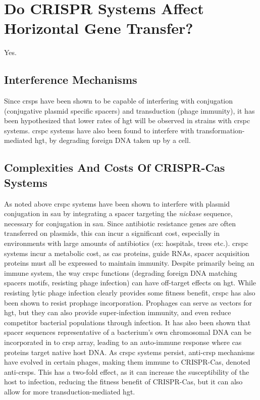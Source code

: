 \section{Do CRISPR Systems Affect Horizontal Gene Transfer?}
Yes.
\subsection{Interference Mechanisms}
Since \ac{crsp}s have been shown to be capable of interfering with conjugation (conjugative plasmid specific spacers) and transduction (phage immunity), it has been hypothesized that lower rates of \ac{hgt} will be observed in strains with \ac{crspc} systems\citep{staphlim}.
\ac{crspc} systems have also been found to interfere with transformation-mediated \ac{hgt}, by degrading foreign DNA taken up by a cell\citep{climtrans}.
\subsection{Complexities And Costs Of CRISPR-Cas Systems}
As noted above \ac{crspc} systems have been shown to interfere with plasmid conjugation in \ac{sau} by integrating a spacer targeting the \textit{nickase} sequence, necessary for conjugation in \ac{sau}\citep{staphlim}.
Since antibiotic resistance genes are often transferred on plasmids, this can incur a significant cost, especially in environments with large amounts of antibiotics (ex: hospitals, trees etc.)\citep{hospital}.
\ac{crspc} systems incur a metabolic cost, as \ac{cas} proteins, guide RNAs, spacer acquisition proteins must all be expressed to maintain immunity\citep{crispgen}.
Despite primarily being an immune system, the way \ac{crspc} functions (degrading foreign DNA matching spacers motifs, resisting phage infection) can have off-target effects on \ac{hgt}\citep{acqorres}.
While resisting lytic phage infection clearly provides some fitness benefit, \ac{crspc} has also been shown to resist prophage incorporation\citep{acqorres}.
Prophages can serve as vectors for \ac{hgt}, but they can also provide super-infection immunity, and even reduce competitor bacterial populations through infection\citep{acqorres,transhgt}.
It has also been shown that spacer sequences representative of a bacterium's own chromosomal DNA can be incorporated in to \ac{crsp} array, leading to an auto-immune response where \ac{cas} proteins target native host DNA\citep{selfcrisp}.
As \ac{crspc} systems persist, anti-\ac{crsp} mechanisms have evolved in certain phages, making them immune to CRISPR-Cas, denoted anti-\ac{crsp}s\citep{acqorres}.
This has a two-fold effect, as it can increase the susceptibility of the host to infection, reducing the fitness benefit of CRISPR-Cas, but it can also allow for more transduction-mediated \ac{hgt}\citep{acqorres}.
